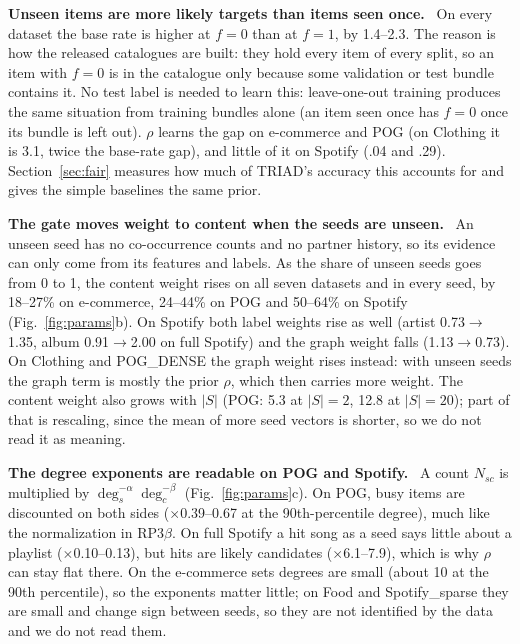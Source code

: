 \documentclass[runningheads]{llncs}
\renewcommand{\paragraph}[1]{\smallskip\noindent\textbf{#1}\ }
\begin{document}
\paragraph{Unseen items are more likely targets than items seen once.} On every dataset the base rate is higher at
$f=0$ than at $f=1$, by 1.4--2.3. The reason is how the released catalogues are built: they hold every item of every
split, so an item with $f=0$ is in the catalogue only because some validation or test bundle contains it. No test
label is needed to learn this: leave-one-out training produces the same situation from training bundles alone (an
item seen once has $f=0$ once its bundle is left out). $\rho$ learns the gap on e-commerce and POG (on Clothing it is
3.1, twice the base-rate gap), and little of it on Spotify (.04 and .29). Section~\ref{sec:fair} measures how much
of TRIAD's accuracy this accounts for and gives the simple baselines the same prior.

\paragraph{The gate moves weight to content when the seeds are unseen.} An unseen seed has no co-occurrence counts
and no partner history, so its evidence can only come from its features and labels. As the share of unseen seeds
goes from 0 to 1, the content weight rises on all seven datasets and in every seed, by 18--27\% on e-commerce,
24--44\% on POG and 50--64\% on Spotify (Fig.~\ref{fig:params}b). On Spotify both label weights rise as well (artist
0.73$\to$1.35, album 0.91$\to$2.00 on full Spotify) and the graph weight falls (1.13$\to$0.73). On Clothing and
POG\_DENSE the graph weight rises instead: with unseen seeds the graph term is mostly the prior $\rho$, which then
carries more weight. The content weight also grows with $|S|$ (POG: 5.3 at $|S|=2$, 12.8 at $|S|=20$); part of that
is rescaling, since the mean of more seed vectors is shorter, so we do not read it as meaning.

\paragraph{The degree exponents are readable on POG and Spotify.} A count $N_{sc}$ is multiplied by
$\deg_s^{-\alpha}\deg_c^{-\beta}$ (Fig.~\ref{fig:params}c). On POG, busy items are discounted on both sides
($\times$0.39--0.67 at the 90th-percentile degree), much like the normalization in RP3$\beta$. On full Spotify a hit
song as a seed says little about a playlist ($\times$0.10--0.13), but hits are likely candidates ($\times$6.1--7.9),
which is why $\rho$ can stay flat there. On the e-commerce sets degrees are small (about 10 at the 90th percentile),
so the exponents matter little; on Food and Spotify\_sparse they are small and change sign between seeds, so they are
not identified by the data and we do not read them.
\end{document}
